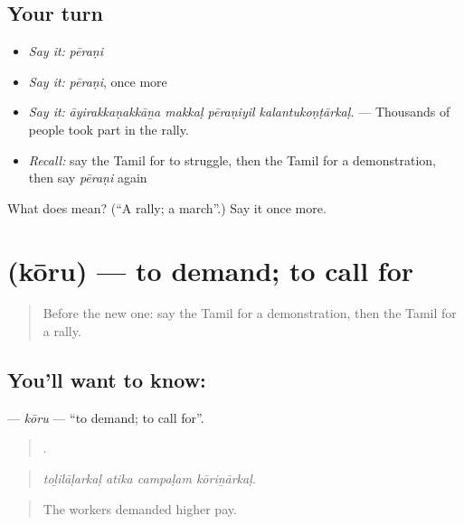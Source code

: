 \subsection*{Your turn}
\begin{itemize}
\raggedright
  \item \emph{Say it:} \emph{pēraṇi}
  \item \emph{Say it:} \emph{pēraṇi}, once more
  \item \emph{Say it:} \emph{āyirakkaṇakkāṉa makkaḷ pēraṇiyil kalantukoṇṭārkaḷ.} — Thousands of people took part in the rally.
  \item \emph{Recall:} say the Tamil for to struggle, then the Tamil for a demonstration, then say \emph{pēraṇi} again
\end{itemize}

\begin{tcolorbox}[breakable,colback=teal!4,colframe=teal!35!black,title={Before you move on}]
What does  mean? (\textquotedblleft{}A rally; a march\textquotedblright{}.) Say it once more.
\end{tcolorbox}
\section[\texorpdfstring{\ta{கோரு} (kōru)}{கோரு (kōru)}]{ (kōru) — to demand; to call for}

\label{lesson:TA-C376-koru}



\begin{quote}
Before the new one: say the Tamil for a demonstration, then the Tamil for a rally.
\end{quote}

\subsection*{You'll want to know: }
\textbf{} — \emph{kōru} — \textquotedblleft{}to demand; to call for\textquotedblright{}.

\begin{quote}
   .
\end{quote}

\begin{quote}
\emph{toḻilāḷarkaḷ atika campaḷam kōriṉārkaḷ.}
\end{quote}

\begin{quote}
The workers demanded higher pay.
\end{quote}

